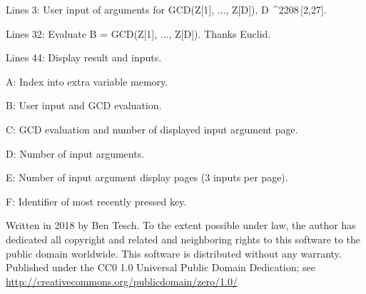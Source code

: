\documentclass[11pt,letterpaper,twocolumn]{article}
\newcommand{\ELEM}{^^^^2208}
\begin{document}
Lines 3: User input of arguments for GCD(Z[1], ..., Z[D]). D\,\ELEM \,[2,27].

Lines 32: Evaluate B = GCD(Z[1], ..., Z[D]). Thanks Euclid.

Lines 44: Display result and inputs.

A: Index into extra variable memory.

B: User input and GCD evaluation.

C: GCD evaluation and number of displayed input argument page.

D: Number of input arguments.

E: Number of input argument display pages (3 inputs per page).

F: Identifier of most recently pressed key.

\vspace{2ex}
\tiny{Written in 2018 by Ben Tesch. To the extent possible under law, the author has dedicated all copyright and related and neighboring rights to this software to the public domain worldwide. This software is distributed without any warranty. Published under the CC0 1.0 Universal Public Domain Dedication; see \url{http://creativecommons.org/publicdomain/zero/1.0/}} 
\end{document}
